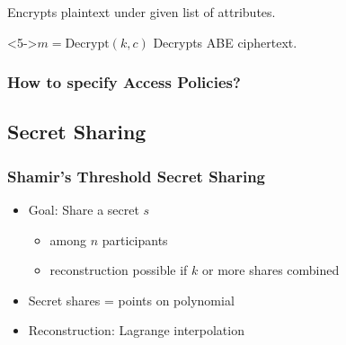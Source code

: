 \begin{frame}[c]
\begin{minipage}[t]{0.49\textwidth}
\begin{block}
            \centering
            Encrypts plaintext under given list of attributes.
        \end{block}
        \vspace{0.5cm}
        \begin{block}<5->{\centering $m = \text{Decrypt}(k, c)$}
            \centering
            Decrypts ABE ciphertext.
        \end{block}
    \end{minipage}
\end{frame}

\begin{frame}[c]
    \frametitle{How to specify Access Policies?}
    
\end{frame}

\subsection{Secret Sharing}
\begin{frame}[c]
    \frametitle{Shamir's Threshold Secret Sharing}
    \begin{minipage}{.5\textwidth}
        \begin{itemize}
            \item<1-> Goal: Share a secret $s$
            \begin{itemize}
                \item among $n$ participants
                \item reconstruction possible if $k$ or more shares combined
            \end{itemize}
            \item<2-> Secret shares = points on polynomial
            \item<3-> Reconstruction: Lagrange interpolation
        \end{itemize}
    \end{minipage}
    \begin{minipage}{.48\textwidth}
        
    \end{minipage}
\end{frame}

